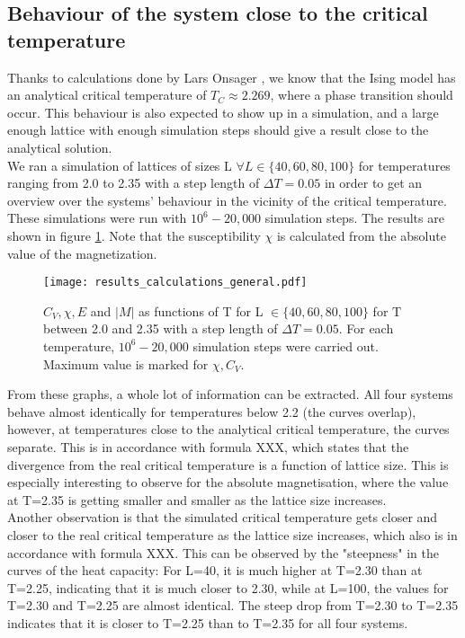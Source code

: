 \documentclass[10pt,a4paper]{article}
\begin{document}
\subsection{Behaviour of the system close to the critical temperature}
Thanks to calculations done by Lars Onsager \cite{onsager1944two}, we know that the Ising model has an analytical critical temperature of $T_C\approx2.269$, where a phase transition should occur. This behaviour is also expected to show up in a simulation, and a large enough lattice with enough simulation steps should give a result close to the analytical solution.\\We ran a simulation of lattices of sizes L $\forall L \in \{40,60,80,100\}$ for temperatures ranging from 2.0 to 2.35 with a step length of $\Delta T=0.05$ in order to get an overview over the systems' behaviour in the vicinity of the critical temperature. These simulations were run with $10^6-20,000$ simulation steps. The results are shown in figure \ref{for T between 2.0 and 2.35}. Note that the susceptibility $\chi$ is calculated from the absolute value of the magnetization. 
\begin{figure}[H]
\texttt{[image: results\_calculations\_general.pdf]}
\caption[$C_V,\chi,E, |M|$ for T between 2.0 and 2.35]{$C_V,\chi,E$ and $|M|$ as functions of T for  L $ \in \{40,60,80,100\}$ for T between 2.0 and 2.35 with a step length of $\Delta T=0.05$. For each temperature, $10^6-20,000$ simulation steps were carried out. Maximum value is marked for $\chi,C_V$.}\label{for T between 2.0 and 2.35}
\end{figure}
From these graphs, a whole lot of information can be extracted. All four systems behave almost identically for temperatures below 2.2 (the curves overlap), however, at temperatures close to the analytical critical temperature, the curves separate. This is in accordance with formula XXX, which states that the divergence from the real critical temperature is a function of lattice size. This is especially interesting to observe for the absolute magnetisation, where the value at T=2.35 is getting smaller and smaller as the lattice size increases.\\
Another observation is that the simulated critical temperature gets closer and closer to the real critical temperature as the lattice size increases, which also is in accordance with formula XXX. This can be observed by the "steepness" in the curves of the heat capacity: For L=40, it is much higher at T=2.30 than at T=2.25, indicating that it is much closer to 2.30, while at L=100, the values for T=2.30 and T=2.25 are almost identical. The steep drop from T=2.30 to T=2.35 indicates that it is closer to T=2.25 than to T=2.35 for all four systems.\\
\end{document}
